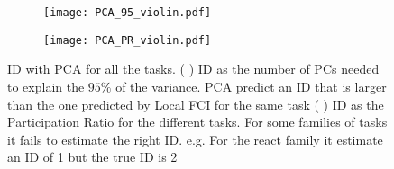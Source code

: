 \documentclass[11pt,a4paper]{article}
\begin{document}
\begin{figure}
    \centering
    \begin{subfigure}[b]{0.45\textwidth}
      \centering
      \texttt{[image: PCA\_95\_violin.pdf]}
      \subcaption{}\label{fig:PCA_ID_alltasks:PCA}
    \end{subfigure}
    \begin{subfigure}[b]{0.45\textwidth}
      \centering
      \texttt{[image: PCA\_PR\_violin.pdf]}
      \subcaption{}\label{fig:PCA_ID_alltasks:PR}
    \end{subfigure}
    \caption{ID with PCA for all the tasks.
    ( )  ID as the number of PCs needed to explain the $95\%$ of the variance.
      PCA predict an ID that is larger than the one predicted by Local FCI for the same task
      ( ) ID as the Participation Ratio for the different tasks.
      For some families of tasks it fails to estimate the right ID.
       e.g. For the react family it estimate an ID of 1 but the true ID is 2
        }\label{fig:PCA_ID_alltasks}
\end{figure}
\end{document}
